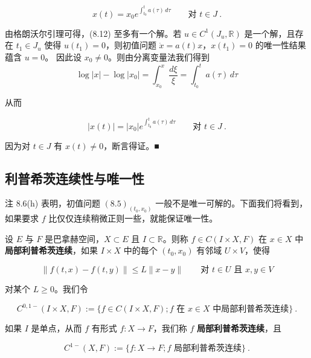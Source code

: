 \begin{example}
\begin{items}
\[
x(t)=x_{0}e^{\int_{t_{0}}^{t}a(\tau)\,d\tau}\qquad\text{对 }t\in J \ .
\]

\proofhead
由格朗沃尔引理可得，(8.12) 至多有一个解。若 $ u\in C^{1}(J_{u},\mathbb{R}) $ 是一个解，且存在 $ t_{1}\in J_{u} $ 使得 $ u(t_{1})=0 $，则初值问题 $ \dot{x}=a(t)x $，$ x(t_{1})=0 $ 的唯一性结果蕴含 $ u=0 $。
因此设 $ x_{0}\ne 0 $。则由分离变量法我们得到
\[
\log|x|-\log|x_{0}|=\int_{x_{0}}^{x}\frac{d\xi}{\xi}=\int_{t_{0}}^{t}a(\tau)\,d\tau
\]

从而

\[
|x(t)|=|x_{0}|e^{\int_{t_{0}}^{t}a(\tau)\,d\tau}\qquad\text{对 }t\in J \ .
\]

因为对 $ t\in J $ 有 $ x(t)\ne 0 $，断言得证。\nobreak\hspace{0.35em}■

\end{items}

\end{example}

\subsection*{利普希茨连续性与唯一性}

注 8.6(h) 表明，初值问题 $ (8.5)_{(t_{0},x_{0})} $ 一般不是唯一可解的。下面我们将看到，如果要求 $ f $ 比仅仅连续稍微正则一些，就能保证唯一性。

设 $ E $ 与 $ F $ 是巴拿赫空间，$ X\subset E $ 且 $ I\subset\mathbb{R} $。则称 $ f\in C(I\times X,F) $ 在 $ x\in X $ 中\textbf{局部利普希茨连续}，如果 $ I\times X $ 中的每个 $ (t_{0},x_{0}) $ 有邻域 $ U\times V $，使得

\[
\|f(t,x)-f(t,y)\|\le L\|x-y\|\qquad\text{对 }t\in U\text{ 且 }x,y\in V
\]

对某个 $ L\ge 0 $。我们令

\[
C^{0,1-}(I\times X,F):=\{f\in C(I\times X,F);f\text{ 在 }x\in X\text{ 中局部利普希茨连续}\} \ .
\]

如果 $ I $ 是单点，从而 $ f $ 有形式 $ f:X\to F $，我们称 $ f $ \textbf{局部利普希茨连续}，且

\[
C^{1-}(X,F):=\{f:X\to F;f\text{ 局部利普希茨连续}\} \ .
\]

